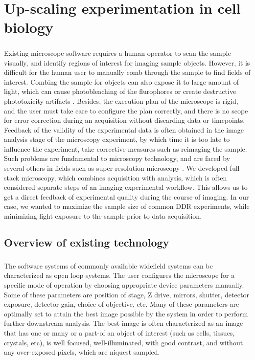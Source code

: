 \chapter{Up-scaling experimentation in cell biology}
\paragraph*{} Existing microscope software requires a human operator to scan the sample visually, and identify regions of interest for imaging sample objects. However, it is difficult for the human user to manually comb through the sample to find fields of interest. Combing the sample for objects can also expose it to large amount of light, which can cause photobleaching of the flurophores or create destructive phototoxicity artifacts \cite{scherf2015smart}. Besides, the execution plan of the microscope is rigid, and the user must take care to configure the plan correctly, and there is no scope for error correction during an acquisition without discarding data or timepoints. Feedback of the validity of the experimental data is often obtained in the image analysis stage of the microscopy experiment, by which time it is too late to influence the experiment, take corrective measures such as reimaging the sample. Such problems are fundamental to microscopy technology, and are faced by several others in fields such as super-resolution microscopy \cite{D1SC05506B}. We developed full-stack microscopy, which combines acquisition with analysis, which is often considered separate steps of an imaging experimental workflow. This allows us to get a direct feedback of experimental quality during the course of imaging. In our case, we wanted to maximize the sample size of common DDR experiments, while minimizing light exposure to the sample prior to data acquisition.


\section{Overview of existing technology}
\paragraph*{}The software systems of commonly available widefield systems can be characterized as open loop systems. The user configures the microscope for a specific mode of operation by choosing appropriate device parameters manually. Some of these parameters are position of stage, Z drive, mirrors, shutter, detector exposure, detector gain, choice of objective, etc. Many of these parameters are optimally set to attain the best image possible by the system in order to perform further downstream analysis. The best image is often characterized as an image that has one or many or a part-of an object of interest (such as cells, tissues, crystals, etc), is well focused, well-illuminated, with good contrast, and without any over-exposed pixels, which are niquest sampled.

